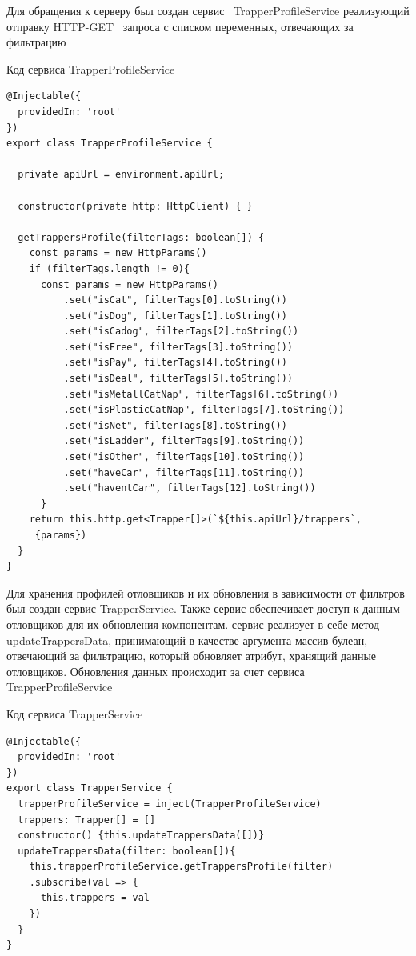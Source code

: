 Для обращения к серверу был создан сервис~\cite{services} TrapperProfileService реализующий отправку HTTP-GET~\cite{http-get} запроса с списком переменных, отвечающих за фильтрацию
\begin{listing}
      \caption{Код сервиса TrapperProfileService}
      \begin{verbatim}
@Injectable({
  providedIn: 'root'
})
export class TrapperProfileService {

  private apiUrl = environment.apiUrl;

  constructor(private http: HttpClient) { }

  getTrappersProfile(filterTags: boolean[]) {
    const params = new HttpParams()
    if (filterTags.length != 0){
      const params = new HttpParams()
          .set("isCat", filterTags[0].toString())
          .set("isDog", filterTags[1].toString())
          .set("isCadog", filterTags[2].toString())
          .set("isFree", filterTags[3].toString())
          .set("isPay", filterTags[4].toString())
          .set("isDeal", filterTags[5].toString())
          .set("isMetallCatNap", filterTags[6].toString())
          .set("isPlasticCatNap", filterTags[7].toString())
          .set("isNet", filterTags[8].toString())
          .set("isLadder", filterTags[9].toString())
          .set("isOther", filterTags[10].toString())
          .set("haveCar", filterTags[11].toString())
          .set("haventCar", filterTags[12].toString())
      }
    return this.http.get<Trapper[]>(`${this.apiUrl}/trappers`,
     {params})
  }
}
    \end{verbatim}
  \end{listing}

Для хранения профилей отловщиков и их обновления в зависимости от фильтров был создан сервис TrapperService.
Также сервис обеспечивает доступ к данным отловщиков для их обновления компонентам.
сервис реализует в себе метод updateTrappersData, принимающий в качестве аргумента массив булеан, отвечающий за фильтрацию, который обновляет атрибут, хранящий данные отловщиков.
Обновления данных происходит за счет сервиса TrapperProfileService


\begin{listing}
      \caption{Код сервиса TrapperService}
      \begin{verbatim}
@Injectable({
  providedIn: 'root'
})
export class TrapperService {
  trapperProfileService = inject(TrapperProfileService)
  trappers: Trapper[] = []
  constructor() {this.updateTrappersData([])}
  updateTrappersData(filter: boolean[]){
    this.trapperProfileService.getTrappersProfile(filter)
    .subscribe(val => {
      this.trappers = val
    })
  }
}
    \end{verbatim}
\end{listing}
